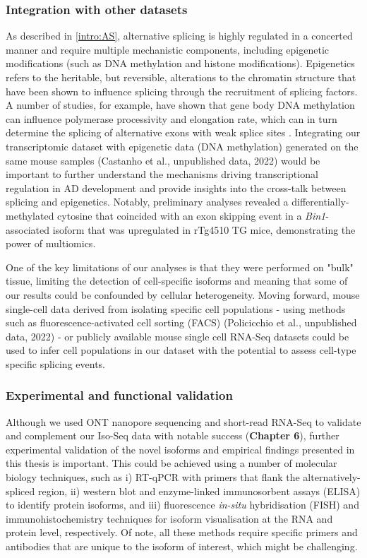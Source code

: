 \subsubsection{Integration with other datasets} 
\label{integration_methylation}
As described in \cref{intro:AS}, alternative splicing is highly regulated in a concerted manner and require multiple mechanistic components, including epigenetic modifications (such as DNA methylation and histone modifications). Epigenetics refers to the heritable, but reversible, alterations to the chromatin structure that have been shown to influence splicing through the recruitment of splicing factors\cite{Yang2014, Shukla2011, Zhang2020a, Shukla2011, Luco2011}. A number of studies, for example, have shown that gene body DNA methylation can influence polymerase processivity and elongation rate, which can in turn determine the splicing of alternative exons with weak splice sites \cite{Yang2014, Shukla2011}. Integrating our transcriptomic dataset with epigenetic data (DNA methylation) generated on the same mouse samples (Castanho et al., unpublished data, 2022) would be important to further understand the mechanisms driving transcriptional regulation in AD development and provide insights into the cross-talk between splicing and epigenetics. Notably, preliminary analyses revealed a differentially-methylated cytosine that coincided with an exon skipping event in a \textit{Bin1}-associated isoform that was upregulated in rTg4510 TG mice, demonstrating the power of multiomics.

One of the key limitations of our analyses is that they were performed on "bulk" tissue, limiting the detection of cell-specific isoforms and meaning that some of our results could be confounded by cellular heterogeneity. Moving forward, mouse single-cell data derived from isolating specific cell populations - using methods such as fluorescence-activated cell sorting (FACS) (Policicchio et al., unpublished data, 2022) - or publicly available mouse single cell RNA-Seq datasets could be used to infer cell populations in our dataset with the potential to assess cell-type specific splicing events.   

\subsubsection{Experimental and functional validation}
\label{ch7: validation}
Although we used ONT nanopore sequencing and short-read RNA-Seq to validate and complement our Iso-Seq data with notable success (\textbf{Chapter 6}), further experimental validation of the novel isoforms and empirical findings presented in this thesis is important. This could be achieved using a number of molecular biology techniques, such as i) RT-qPCR with primers that flank the alternatively-spliced region, ii) western blot and enzyme-linked immunosorbent assays (ELISA) to identify protein isoforms, and iii) fluorescence \textit{in-situ} hybridisation (FISH) and immunohistochemistry techniques for isoform visualisation at the RNA and protein level, respectively. Of note, all these methods require specific primers and antibodies that are unique to the isoform of interest, which might be challenging. 

